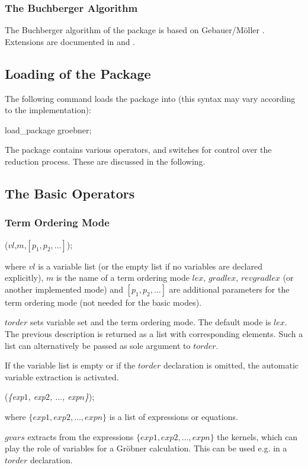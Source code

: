 \subsubsection{The Buchberger Algorithm}
The Buchberger algorithm of the package is based on {\sc
Gebauer/M\"oller} \cite{Gebauer:88}.
Extensions are documented in \cite{Melenk:88} and \cite{Giovini:91}.

\subsection{Loading of the Package}
The following command loads the package into
\REDUCE (this syntax may vary according to the implementation):
\begin{center}
load\_package groebner;
\end{center}

The package contains various operators, and switches for control
over the reduction process. These are discussed in the following.

\subsection{The Basic Operators}

\subsubsection{Term Ordering Mode}

\begin{description}
\item [{\it torder}]($vl$,$m$,$[p_1,p_2,\ldots]$);

where $vl$ is a variable list (or the empty list if
no variables are declared explicitly),
$m$ is the name of a term ordering mode $lex$, $gradlex$,
$revgradlex$ (or another implemented mode) and
$[p_1,p_2,\ldots]$ are additional parameters for the
term ordering mode (not needed for the basic modes).

$torder$ sets variable set and the term ordering mode.
The default mode is $lex$. The previous description is returned
as a list with corresponding elements. Such a list can
alternatively be passed as sole argument to $torder$.

If the variable list is empty or if the $torder$ declaration
is omitted, the automatic variable extraction is activated.

\item[{\it gvars}] ({\it\{exp$1$, exp$2$, $ \ldots$, exp$n$\}});

 where $\{exp1, exp2, \ldots , expn\}$ is a list of expressions or
equations.

$gvars$ extracts from the expressions $\{exp1, exp2, \ldots , expn\}$
the kernels, which can play the role of variables for a Gr\"obner
calculation. This can be used e.g. in a $torder$ declaration.
\end{description}

